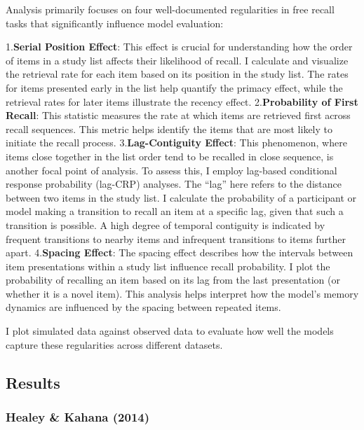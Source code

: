 \documentclass[
  letterpaper,
  11pt,
  english,
  singlespacing,
  headsepline]{MastersDoctoralThesis}
\begin{document}
Analysis primarily focuses on four well-documented regularities in free
recall tasks that significantly influence model evaluation:

1.\textbf{Serial Position Effect}: This effect is crucial for
understanding how the order of items in a study list affects their
likelihood of recall. I calculate and visualize the retrieval rate for
each item based on its position in the study list. The rates for items
presented early in the list help quantify the primacy effect, while the
retrieval rates for later items illustrate the recency effect.
2.\textbf{Probability of First Recall}: This statistic measures the rate
at which items are retrieved first across recall sequences. This metric
helps identify the items that are most likely to initiate the recall
process. 3.\textbf{Lag-Contiguity Effect}: This phenomenon, where items
close together in the list order tend to be recalled in close sequence,
is another focal point of analysis. To assess this, I employ lag-based
conditional response probability (lag-CRP) analyses. The ``lag'' here
refers to the distance between two items in the study list. I calculate
the probability of a participant or model making a transition to recall
an item at a specific lag, given that such a transition is possible. A
high degree of temporal contiguity is indicated by frequent transitions
to nearby items and infrequent transitions to items further apart.
4.\textbf{Spacing Effect}: The spacing effect describes how the
intervals between item presentations within a study list influence
recall probability. I plot the probability of recalling an item based on
its lag from the last presentation (or whether it is a novel item). This
analysis helps interpret how the model's memory dynamics are influenced
by the spacing between repeated items.

I plot simulated data against observed data to evaluate how well the
models capture these regularities across different datasets.

\subsection{Results}\label{results}

\subsubsection{Healey \& Kahana (2014)}\label{healey-kahana-2014}
\end{document}
